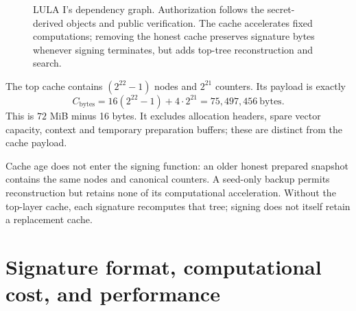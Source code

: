 \documentclass[a4paper,envcountsame,runningheads]{llncs}
\begin{document}
\begin{figure}[!htbp]
\centering
{}
\caption{LULA I's dependency graph. Authorization follows the secret-derived objects and public verification. The cache accelerates fixed computations; removing the honest cache preserves signature bytes whenever signing terminates, but adds top-tree reconstruction and search.}\label{fig:dependency}
\end{figure}

The top cache contains $(2^{22}-1)$ nodes and $2^{21}$ counters. Its payload is exactly
\begin{equation}\label{eq:cache}
 C_{\mathrm{bytes}}=16(2^{22}-1)+4\cdot2^{21}
 =75{,}497{,}456\ \mathrm{bytes}.
\end{equation}
This is $72$ MiB minus 16 bytes. It excludes allocation headers, spare vector capacity, context and temporary preparation buffers; these are distinct from the cache payload.

Cache age does not enter the signing function: an older honest prepared snapshot contains the same nodes and canonical counters. A seed-only backup permits reconstruction but retains none of its computational acceleration. Without the top-layer cache, each signature recomputes that tree; signing does not itself retain a replacement cache.



\section{Signature format, computational cost, and performance}\label{sec:cost}
\end{document}
